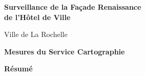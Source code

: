 \begin{center}
  \Large
  \textbf{Surveillance de la Façade Renaissance\\de l'Hôtel de Ville}

  \vspace{0.4cm}
  \large
  Ville de La Rochelle

  \vspace{0.4cm}
  \textbf{Mesures du Service Cartographie}

  \vspace{0.9cm}
  \textbf{Résumé}
\end{center}

